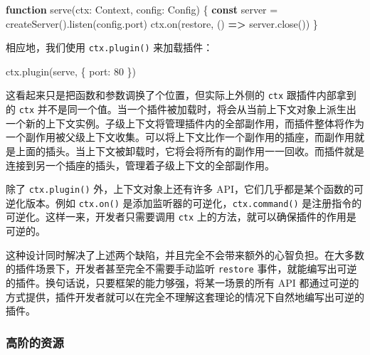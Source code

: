 \documentclass[
  chinese,
  11pt,
]{article}
\newenvironment{Shaded}{}{}
\newcommand{\AttributeTok}[1]{\textcolor[rgb]{0.49,0.56,0.16}{#1}}
\newcommand{\DecValTok}[1]{\textcolor[rgb]{0.25,0.63,0.44}{#1}}
\newcommand{\FunctionTok}[1]{\textcolor[rgb]{0.02,0.16,0.49}{#1}}
\newcommand{\KeywordTok}[1]{\textcolor[rgb]{0.00,0.44,0.13}{\textbf{#1}}}
\newcommand{\NormalTok}[1]{#1}
\newcommand{\OperatorTok}[1]{\textcolor[rgb]{0.40,0.40,0.40}{#1}}
\newcommand{\StringTok}[1]{\textcolor[rgb]{0.25,0.44,0.63}{#1}}
\begin{document}
\begin{Shaded}
\begin{Highlighting}[]
\KeywordTok{function} \FunctionTok{serve}\NormalTok{(ctx}\OperatorTok{:}\NormalTok{ Context}\OperatorTok{,}\NormalTok{ config}\OperatorTok{:}\NormalTok{ Config) \{}
  \KeywordTok{const}\NormalTok{ server }\OperatorTok{=} \FunctionTok{createServer}\NormalTok{()}\OperatorTok{.}\FunctionTok{listen}\NormalTok{(config}\OperatorTok{.}\AttributeTok{port}\NormalTok{)}
\NormalTok{  ctx}\OperatorTok{.}\FunctionTok{on}\NormalTok{(}\StringTok{\textquotesingle{}restore\textquotesingle{}}\OperatorTok{,}\NormalTok{ () }\KeywordTok{=\textgreater{}}\NormalTok{ server}\OperatorTok{.}\FunctionTok{close}\NormalTok{())}
\NormalTok{\}}
\end{Highlighting}
\end{Shaded}

相应地，我们使用 \texttt{ctx.plugin()} 来加载插件：

\begin{Shaded}
\begin{Highlighting}[]
\NormalTok{ctx}\OperatorTok{.}\FunctionTok{plugin}\NormalTok{(serve}\OperatorTok{,}\NormalTok{ \{ port}\OperatorTok{:} \DecValTok{80}\NormalTok{ \})}
\end{Highlighting}
\end{Shaded}

这看起来只是把函数和参数调换了个位置，但实际上外侧的 \texttt{ctx}
跟插件内部拿到的 \texttt{ctx}
并不是同一个值。当一个插件被加载时，将会从当前上下文对象上派生出一个新的上下文实例。子级上下文将管理插件内的全部副作用，而插件整体将作为一个副作用被父级上下文收集。可以将上下文比作一个副作用的插座，而副作用就是上面的插头。当上下文被卸载时，它将会将所有的副作用一一回收。而插件就是连接到另一个插座的插头，管理着子级上下文的全部副作用。

除了 \texttt{ctx.plugin()} 外，上下文对象上还有许多
API，它们几乎都是某个函数的可逆化版本。例如 \texttt{ctx.on()}
是添加监听器的可逆化，\texttt{ctx.command()}
是注册指令的可逆化。这样一来，开发者只需要调用 \texttt{ctx}
上的方法，就可以确保插件的作用是可逆的。

这种设计同时解决了上述两个缺陷，并且完全不会带来额外的心智负担。在大多数的插件场景下，开发者甚至完全不需要手动监听
\texttt{restore}
事件，就能编写出可逆的插件。换句话说，只要框架的能力够强，将某一场景的所有
API
都通过可逆的方式提供，插件开发者就可以在完全不理解这套理论的情况下自然地编写出可逆的插件。

\subsubsection{高阶的资源}\label{ux9ad8ux9636ux7684ux8d44ux6e90}
\end{document}
